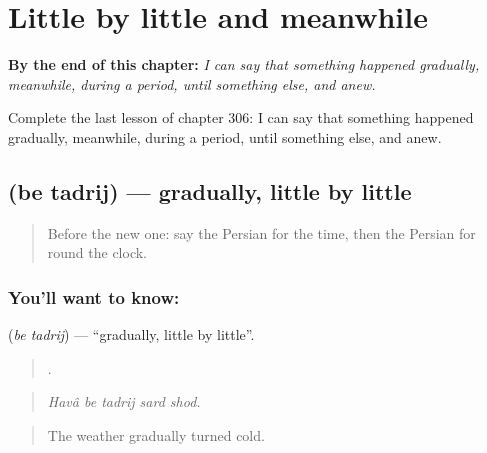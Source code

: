 
\chapter{Little by little and meanwhile}
\label{ch:fa-little-by-little-and-meanwhile}

\begin{chapteropening}
\textbf{By the end of this chapter:} \emph{I can say that something happened gradually, meanwhile, during a period, until something else, and anew.}

Complete the last lesson of chapter 306: I can say that something happened gradually, meanwhile, during a period, until something else, and anew.
\end{chapteropening}

\section[\texorpdfstring{\fa{به} \fa{تدریج} (be tadrij)}{به تدریج (be tadrij)}]{  (be tadrij) — gradually, little by little}

\label{lesson:FA-C306-be-tadrij}



\begin{quote}
Before the new one: say the Persian for the time, then the Persian for round the clock.
\end{quote}

\subsection*{You'll want to know:  }
\textbf{ } (\emph{be tadrij}) — \textquotedblleft{}gradually, little by little\textquotedblright{}.

\begin{quote}
    .
\end{quote}

\begin{quote}
\emph{Havâ be tadrij sard shod.}
\end{quote}

\begin{quote}
The weather gradually turned cold.
\end{quote}

